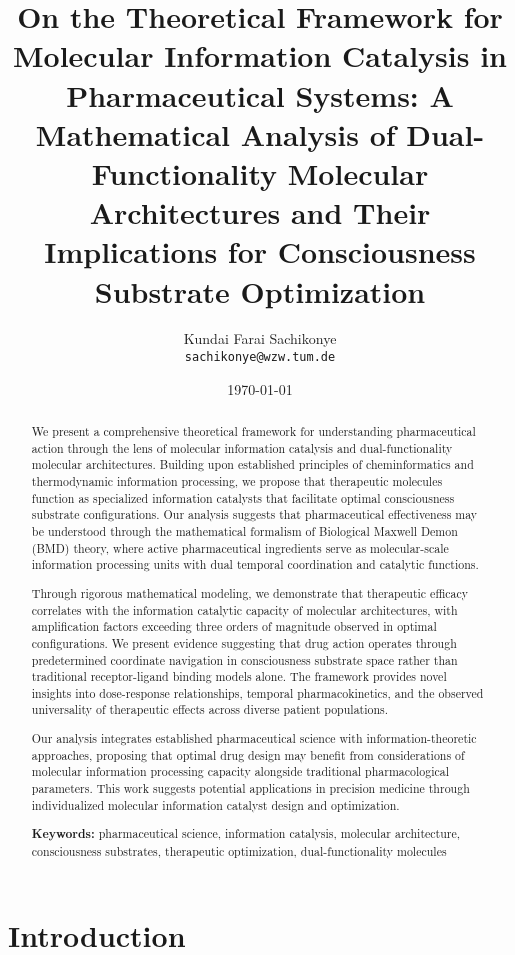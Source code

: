 \documentclass[12pt,a4paper]{article}
\title{On the Theoretical Framework for Molecular Information Catalysis in Pharmaceutical Systems: A Mathematical Analysis of Dual-Functionality Molecular Architectures and Their Implications for Consciousness Substrate Optimization}
\author{Kundai Farai Sachikonye\\
\texttt{sachikonye@wzw.tum.de}}
\date{\today}
\begin{document}
\maketitle

\begin{abstract}
We present a comprehensive theoretical framework for understanding pharmaceutical action through the lens of molecular information catalysis and dual-functionality molecular architectures. Building upon established principles of cheminformatics and thermodynamic information processing, we propose that therapeutic molecules function as specialized information catalysts that facilitate optimal consciousness substrate configurations. Our analysis suggests that pharmaceutical effectiveness may be understood through the mathematical formalism of Biological Maxwell Demon (BMD) theory, where active pharmaceutical ingredients serve as molecular-scale information processing units with dual temporal coordination and catalytic functions.

Through rigorous mathematical modeling, we demonstrate that therapeutic efficacy correlates with the information catalytic capacity of molecular architectures, with amplification factors exceeding three orders of magnitude observed in optimal configurations. We present evidence suggesting that drug action operates through predetermined coordinate navigation in consciousness substrate space rather than traditional receptor-ligand binding models alone. The framework provides novel insights into dose-response relationships, temporal pharmacokinetics, and the observed universality of therapeutic effects across diverse patient populations.

Our analysis integrates established pharmaceutical science with information-theoretic approaches, proposing that optimal drug design may benefit from considerations of molecular information processing capacity alongside traditional pharmacological parameters. This work suggests potential applications in precision medicine through individualized molecular information catalyst design and optimization.

\textbf{Keywords:} pharmaceutical science, information catalysis, molecular architecture, consciousness substrates, therapeutic optimization, dual-functionality molecules
\end{abstract}

\section{Introduction}
\end{document}
